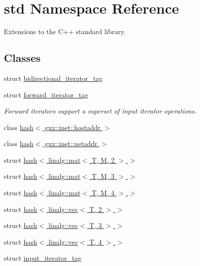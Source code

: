 \hypertarget{namespacestd}{}\section{std Namespace Reference}
\label{namespacestd}


Extensions to the C++ standard library.  


\subsection*{Classes}
\begin{DoxyCompactItemize}
\item 
struct \hyperlink{structstd_1_1bidirectional__iterator__tag}{bidirectional\+\_\+iterator\+\_\+tag}
\item 
struct \hyperlink{structstd_1_1forward__iterator__tag}{forward\+\_\+iterator\+\_\+tag}
\begin{DoxyCompactList}\small\item\em Forward iterators support a superset of input iterator operations. \end{DoxyCompactList}\item 
class \hyperlink{classstd_1_1hash_3_01gxx_1_1inet_1_1hostaddr_01_4}{hash$<$ gxx\+::inet\+::hostaddr $>$}
\item 
class \hyperlink{classstd_1_1hash_3_01gxx_1_1inet_1_1netaddr_01_4}{hash$<$ gxx\+::inet\+::netaddr $>$}
\item 
struct \hyperlink{structstd_1_1hash_3_01linalg_1_1mat_3_01T_00_01M_00_012_01_4_01_4}{hash$<$ linalg\+::mat$<$ T, M, 2 $>$ $>$}
\item 
struct \hyperlink{structstd_1_1hash_3_01linalg_1_1mat_3_01T_00_01M_00_013_01_4_01_4}{hash$<$ linalg\+::mat$<$ T, M, 3 $>$ $>$}
\item 
struct \hyperlink{structstd_1_1hash_3_01linalg_1_1mat_3_01T_00_01M_00_014_01_4_01_4}{hash$<$ linalg\+::mat$<$ T, M, 4 $>$ $>$}
\item 
struct \hyperlink{structstd_1_1hash_3_01linalg_1_1vec_3_01T_00_012_01_4_01_4}{hash$<$ linalg\+::vec$<$ T, 2 $>$ $>$}
\item 
struct \hyperlink{structstd_1_1hash_3_01linalg_1_1vec_3_01T_00_013_01_4_01_4}{hash$<$ linalg\+::vec$<$ T, 3 $>$ $>$}
\item 
struct \hyperlink{structstd_1_1hash_3_01linalg_1_1vec_3_01T_00_014_01_4_01_4}{hash$<$ linalg\+::vec$<$ T, 4 $>$ $>$}
\item 
struct \hyperlink{structstd_1_1input__iterator__tag}{input\+\_\+iterator\+\_\+tag}

\end{DoxyCompactItemize}
